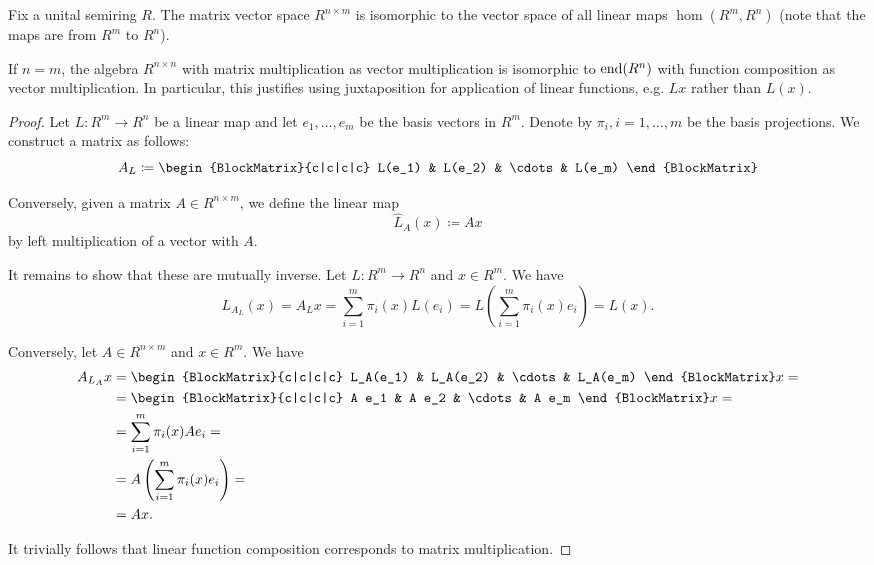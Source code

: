 \begin{proposition}\label{thm:finite_dimensional_operators_are_isomorphic_to_matrices}
  Fix a unital semiring \( R \). The matrix vector space \( R^{n \times m} \) is isomorphic to the vector space of all linear maps \( \hom(R^m, R^n) \) (note that the maps are from \( R^m \) to \( R^n \)).

  If \( n = m \), the algebra \( R^{n \times n} \) with matrix multiplication as vector multiplication is isomorphic to \( \operatorname{end}(R^n) \) with function composition as vector multiplication. In particular, this justifies using juxtaposition for application of linear functions, e.g. \( Lx \) rather than \( L(x) \).
\end{proposition}
\begin{proof}
  Let \( L: R^m \to R^n \) be a linear map and let \( e_1, \ldots, e_m \) be the basis vectors in \( R^m \). Denote by \( \pi_i, i = 1, \ldots, m \) be the basis projections. We construct a matrix as follows:
  \begin{equation*}
    A_L \coloneqq \begin{BlockMatrix}{c|c|c|c}
      L(e_1) & L(e_2) & \cdots & L(e_m)
    \end{BlockMatrix}
  \end{equation*}

  Conversely, given a matrix \( A \in R^{n \times m} \), we define the linear map
  \begin{equation*}
    \hat L_A(x) \coloneqq Ax
  \end{equation*}
  by left multiplication of a vector with \( A \).

  It remains to show that these are mutually inverse. Let \( L: R^m \to R^n \) and \( x \in R^m \). We have
  \begin{equation*}
    L_{A_L}(x) = A_L x = \sum_{i=1}^m \pi_i(x) L(e_i) = L\left(\sum_{i=1}^m \pi_i(x) e_i \right) = L(x).
  \end{equation*}

  Conversely, let \( A \in R^{n \times m} \) and \( x \in R^m \). We have
  \begin{align*}
    A_{L_A} x
    &=
    \begin{BlockMatrix}{c|c|c|c}
      L_A(e_1) & L_A(e_2) & \cdots & L_A(e_m)
    \end{BlockMatrix}
    x
    = \\ &=
    \begin{BlockMatrix}{c|c|c|c}
      A e_1 & A e_2 & \cdots & A e_m
    \end{BlockMatrix}
    x
    = \\ &=
    \sum_{i=1}^m \pi_i(x) A e_i
    = \\ &=
    A \left( \sum_{i=1}^m \pi_i(x) e_i \right)
    = \\ &=
    Ax.
  \end{align*}

  It trivially follows that linear function composition corresponds to matrix multiplication.
\end{proof}

